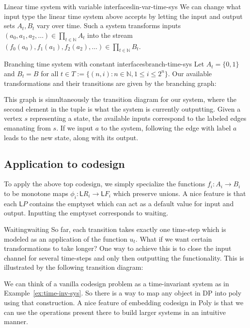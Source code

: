 \documentclass[12pt, a4paper]{article}
\theoremstyle{definition}
\theoremstyle{plain}
\theoremstyle{plain}
\theoremstyle{plain}
\theoremstyle{plain}
\theoremstyle{plain}
\theoremstyle{remark}
\theoremstyle{remark}
\newcommand{\low}{\mathsf{L}}
\begin{document}
\begin{tcexample}{Linear time system with variable interfaces}{lin-var-time-sys}
    We can change what input type the linear time system above accepts by letting the input and output sets $A_t, B_t$ vary over time. Such a system transforms inputs $(a_0, a_1, a_2, \ldots) \in \prod_{t \in \mathbb{N}} A_t$ into the stream $(f_0(a_0), f_1(a_1), f_2(a_2), \ldots)\in \prod_{t \in \mathbb{N}} B_t$.
\end{tcexample}

\begin{tcexample}{Branching time system with constant interfaces}{branch-time-sys}
    Let $A_t = \{0,1\}$ and $B_t = B$ for all $t \in T := \{(n,i) : n \in \mathbb{N}, 1 \leq i \leq 2^n \}$. Our available transformations and their transitions are given by the branching graph:

    This graph is simultaneously the transition diagram for our system, where the second element in the tuple is what the system is currently outputting. Given a vertex $s$ representing a state, the available inputs correspond to the labeled edges emanating from $s$. If we input $a$ to the system, following the edge with label $a$ leads to the new state, along with its output.
\end{tcexample}

\subsection{Application to codesign}
To apply the above top codesign, we simply specialize the functions $f_i: A_i \rightarrow B_i$ to be monotone maps $\phi_i: \low R_i \rightarrow \low F_i$ which preserve unions. A nice feature is that each $\low P$ contains the emptyset which can act as a default value for input and output. Inputting the emptyset corresponds to waiting.

\begin{tcexample}{Waiting}{waiting}
    So far, each transition takes exactly one time-step which is modeled as an application of the function $u_t$. What if we want certain transformations to take longer? One way to achieve this is to close the input channel for several time-steps and only then outputting the functionality. This is illustrated by the following transition diagram:

\end{tcexample}

We can think of a vanilla codesign problem as a time-invariant system as in Example~\ref{ex:time-inv-sys}. So there is a way to map any object in \textsf{DP} into poly using that construction. A nice feature of embedding codesign in \textsf{Poly} is that we can use the operations present there to build larger systems in an intuitive manner.
\end{document}
